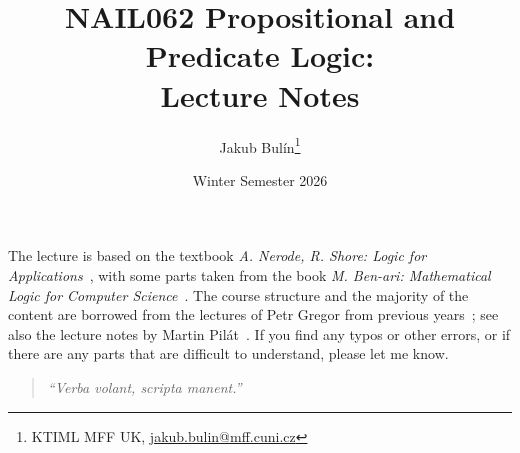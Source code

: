\title{NAIL062 Propositional and Predicate Logic: \\ Lecture Notes}
\author{Jakub Bulín\footnote{KTIML MFF UK, \href{mailto://jakub.bulin@mff.cuni.cz}{jakub.bulin@mff.cuni.cz}}}
\date{Winter Semester 2026}
\maketitle

The lecture is based on the textbook \emph{A. Nerode, R. Shore: Logic for Applications}~\cite{nerode_logic_2012}, with some parts taken from the book \emph{M. Ben-ari: Mathematical Logic for Computer Science}~\cite{ben-ari_mathematical_2012}. The course structure and the majority of the content are borrowed from the lectures of Petr Gregor from previous years~\cite{gregor_vyrokova_nodate}; see also the lecture notes by Martin Pilát~\cite{pilat_lecture_nodate}. If you find any typos or other errors, or if there are any parts that are difficult to understand, please let me know.

\vfill 

\begin{quote}
    \itshape
    ``Verba volant, scripta manent.''
\end{quote}

\tableofcontents
